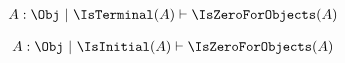 \begin{sequent}
\begin{align*}
 A:\Obj ~|~ \IsTerminal( A ) \vdash \IsZeroForObjects( A )
\end{align*}
\end{sequent}

\begin{sequent}
\begin{align*}
 A:\Obj ~|~ \IsInitial( A ) \vdash \IsZeroForObjects( A )
\end{align*}
\end{sequent}
